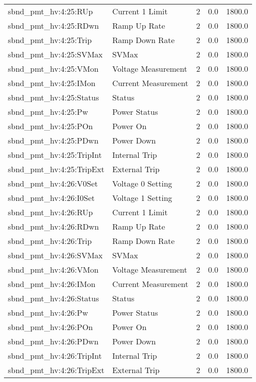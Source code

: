 \begin{center}
\begin{longtable}{l | l l l l }
sbnd\_pmt\_hv:4:25:RUp & Current 1 Limit & 2 & 0.0 & 1800.0\\ 
sbnd\_pmt\_hv:4:25:RDwn & Ramp Up Rate & 2 & 0.0 & 1800.0\\ 
sbnd\_pmt\_hv:4:25:Trip & Ramp Down Rate & 2 & 0.0 & 1800.0\\ 
sbnd\_pmt\_hv:4:25:SVMax & SVMax & 2 & 0.0 & 1800.0\\ 
sbnd\_pmt\_hv:4:25:VMon & Voltage Measurement & 2 & 0.0 & 1800.0\\ 
sbnd\_pmt\_hv:4:25:IMon & Current Measurement & 2 & 0.0 & 1800.0\\ 
sbnd\_pmt\_hv:4:25:Status & Status & 2 & 0.0 & 1800.0\\ 
sbnd\_pmt\_hv:4:25:Pw & Power Status & 2 & 0.0 & 1800.0\\ 
sbnd\_pmt\_hv:4:25:POn & Power On & 2 & 0.0 & 1800.0\\ 
sbnd\_pmt\_hv:4:25:PDwn & Power Down & 2 & 0.0 & 1800.0\\ 
sbnd\_pmt\_hv:4:25:TripInt & Internal Trip & 2 & 0.0 & 1800.0\\ 
sbnd\_pmt\_hv:4:25:TripExt & External Trip & 2 & 0.0 & 1800.0\\ 
sbnd\_pmt\_hv:4:26:V0Set & Voltage 0 Setting & 2 & 0.0 & 1800.0\\ 
sbnd\_pmt\_hv:4:26:I0Set & Voltage 1 Setting & 2 & 0.0 & 1800.0\\ 
sbnd\_pmt\_hv:4:26:RUp & Current 1 Limit & 2 & 0.0 & 1800.0\\ 
sbnd\_pmt\_hv:4:26:RDwn & Ramp Up Rate & 2 & 0.0 & 1800.0\\ 
sbnd\_pmt\_hv:4:26:Trip & Ramp Down Rate & 2 & 0.0 & 1800.0\\ 
sbnd\_pmt\_hv:4:26:SVMax & SVMax & 2 & 0.0 & 1800.0\\ 
sbnd\_pmt\_hv:4:26:VMon & Voltage Measurement & 2 & 0.0 & 1800.0\\ 
sbnd\_pmt\_hv:4:26:IMon & Current Measurement & 2 & 0.0 & 1800.0\\ 
sbnd\_pmt\_hv:4:26:Status & Status & 2 & 0.0 & 1800.0\\ 
sbnd\_pmt\_hv:4:26:Pw & Power Status & 2 & 0.0 & 1800.0\\ 
sbnd\_pmt\_hv:4:26:POn & Power On & 2 & 0.0 & 1800.0\\ 
sbnd\_pmt\_hv:4:26:PDwn & Power Down & 2 & 0.0 & 1800.0\\ 
sbnd\_pmt\_hv:4:26:TripInt & Internal Trip & 2 & 0.0 & 1800.0\\ 
sbnd\_pmt\_hv:4:26:TripExt & External Trip & 2 & 0.0 & 1800.0\\ 

\end{longtable}
\end{center}
